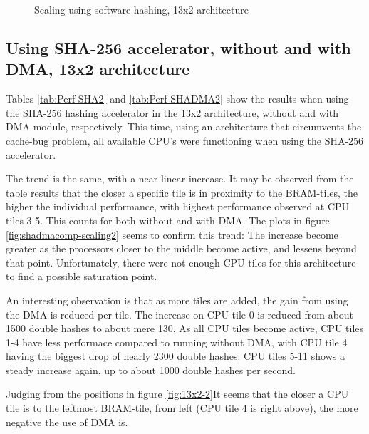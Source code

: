 \begin{appendix}
\begin{figure}
	\caption{Scaling using software hashing, 13x2 architecture}
	\label{fig:sw-scaling2}
\end{figure}

\subsection{Using SHA-256 accelerator, without and with DMA, 13x2 architecture}

Tables \ref{tab:Perf-SHA2} and \ref{tab:Perf-SHADMA2} show the results when using the SHA-256 hashing accelerator in the 13x2 architecture, without and with DMA module, respectively.
This time, using an architecture that circumvents the cache-bug problem, all available CPU's were functioning when using the SHA-256 accelerator.

The trend is the same, with a near-linear increase.
It may be observed from the table results that the closer a specific tile is in proximity to the BRAM-tiles, the higher the individual performance, with highest performance observed at CPU tiles 3-5.
This counts for both without and with DMA. 
The plots in figure \ref{fig:shadmacomp-scaling2} seems to confirm this trend: The increase become greater as the processors closer to the middle become active, and lessens beyond that point.
Unfortunately, there were not enough CPU-tiles for this architecture to find a possible saturation point.

An interesting observation is that as more tiles are added, the gain from using the DMA is reduced per tile.
The increase on CPU tile 0 is reduced from about 1500 double hashes to about mere 130.
As all CPU tiles become active, CPU tiles 1-4 have less performace compared to running without DMA, with CPU tile 4 having the biggest drop of nearly 2300 double hashes. 
CPU tiles 5-11 shows a steady increase again, up to about 1000 double hashes per second.

Judging from the positions in figure \ref{fig:13x2-2}It seems that the closer a CPU tile is to the leftmost BRAM-tile, from left (CPU tile 4 is right above), the more negative the use of DMA is.



\end{appendix}
